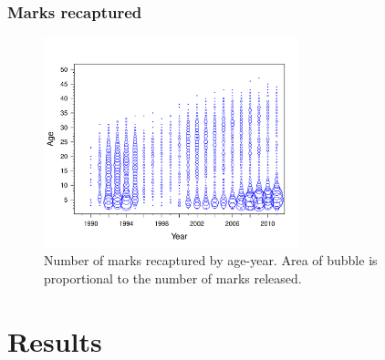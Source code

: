 \documentclass{beamer}
\begin{document}
\begin{frame}[t]\frametitle{Marks recaptured}
	{
		\begin{figure}[htbp]
			\centering
				\includegraphics[height=2.4in]{../../FIGS/ASMR/fig:rta.pdf}
			\caption{Number of marks recaptured by age-year. Area of bubble is proportional to the number of marks released.}
			\label{fig:FIGS_ASMR_fig:rta}
		\end{figure}
	}
\end{frame}
%
%
\section[Results]{Results} %
\label{sec:results}
\end{document}
